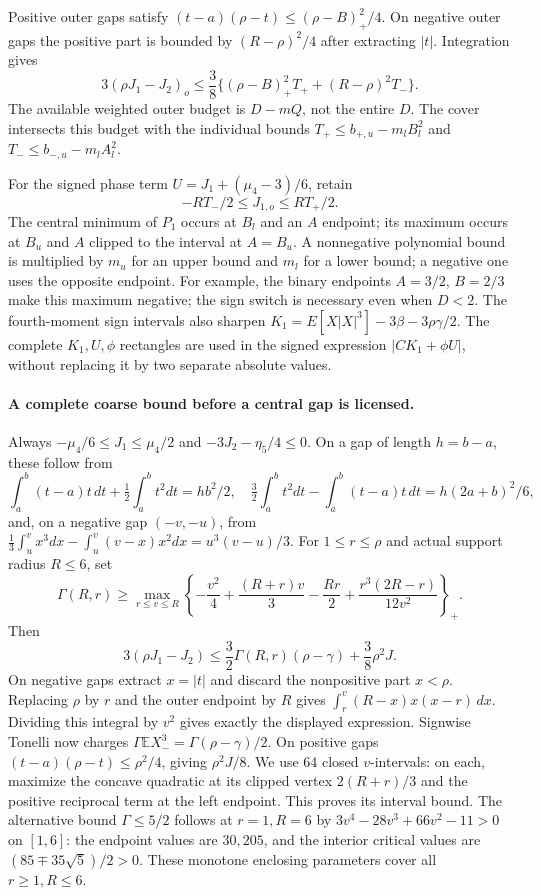 \documentclass[11pt,a4paper]{article}
\numberwithin{equation}{section}
\theoremstyle{definition}
\theoremstyle{remark}
\newcommand{\E}{\mathbb E}
\begin{document}
Positive outer gaps satisfy
$(t-a)(\rho-t)\le(\rho-B)_+^2/4$. On negative outer gaps the positive
part is bounded by $(R-\rho)^2/4$ after extracting $|t|$.
Integration gives
\[
 3(\rho J_1-J_2)_o
 \le\frac38\{(\rho-B)_+^2T_++(R-\rho)^2T_-\}.
\]
The available weighted outer budget is $D-mQ$, not the entire $D$.
The cover intersects this budget with the individual bounds
$T_+\le b_{+,u}-m_lB_l^2$ and $T_-\le b_{-,u}-m_lA_l^2$.

For the signed phase term $U=J_1+(\mu_4-3)/6$, retain
\[
 -RT_-/2\le J_{1,o}\le RT_+/2.
\]
The central minimum of $P_1$ occurs at $B_l$ and an $A$ endpoint;
its maximum occurs at $B_u$ and $A$ clipped to the interval at $A=B_u$.
A nonnegative polynomial bound is multiplied by $m_u$ for an upper
bound and $m_l$ for a lower bound; a negative one uses the opposite
endpoint. For example, the binary endpoints $A=3/2$, $B=2/3$ make this
maximum negative; the sign switch is necessary even when $D<2$.
The fourth-moment sign intervals also sharpen
$K_1=E[X|X|^3]-3\beta-3\rho\gamma/2$.
The complete $K_1,U,\phi$ rectangles are used in the signed expression
$|CK_1+\phi U|$, without replacing it by two separate absolute values.

\paragraph{A complete coarse bound before a central gap is licensed.}
Always $-\mu_4/6\le J_1\le\mu_4/2$ and
$-3J_2-\eta_5/4\le0$. On a gap of length $h=b-a$, these follow from
\[
 \int_a^b(t-a)t\,dt+\tfrac12\int_a^bt^2dt=hb^2/2,\quad
 \tfrac32\int_a^bt^2dt-\int_a^b(t-a)t\,dt=h(2a+b)^2/6,
\]
and, on a negative gap $(-v,-u)$, from
$\tfrac13\int_u^v x^3dx-\int_u^v(v-x)x^2dx=u^3(v-u)/3$.
For $1\le r\le\rho$ and actual support radius $R\le6$, set
\[
 \Gamma(R,r)\ge\max_{r\le v\le R}
 \left\{-\frac{v^2}4+\frac{(R+r)v}3-\frac{Rr}2+
                      \frac{r^3(2R-r)}{12v^2}\right\}_+.
\]
Then
\[
 3(\rho J_1-J_2)\le\frac32\Gamma(R,r)(\rho-\gamma)
                              +\frac38\rho^2J.
\]
On negative gaps extract $x=|t|$ and discard the nonpositive part
$x<\rho$. Replacing $\rho$ by $r$ and the outer endpoint by $R$
gives $\int_r^v(R-x)x(x-r)\,dx$. Dividing this integral by $v^2$
gives exactly the displayed expression. Signwise Tonelli now charges
$\Gamma\E X_-^3=\Gamma(\rho-\gamma)/2$.
On positive gaps $(t-a)(\rho-t)\le\rho^2/4$, giving $\rho^2J/8$.
We use 64 closed $v$-intervals: on each, maximize the
concave quadratic at its clipped vertex $2(R+r)/3$ and the positive
reciprocal term at the left endpoint. This proves its interval bound.
The alternative bound $\Gamma\le5/2$ follows at $r=1,R=6$ by
$3v^4-28v^3+66v^2-11>0$ on $[1,6]$: the endpoint values are $30,205$,
and the interior critical values are $(85\mp35\sqrt5)/2>0$.
These monotone enclosing parameters cover all $r\ge1,R\le6$.
\end{document}
